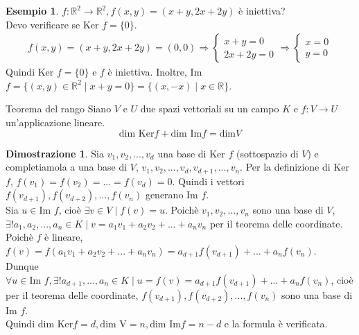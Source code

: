 \documentclass[a4paper]{article}
\theoremstyle{definition}
\newtheorem*{dimm}{Dimostrazione}
\newtheorem*{es}{Esempio}
\begin{document}
\begin{es}
	$f: \mathbb{R}^2 \rightarrow \mathbb{R}^2, f(x, y) = (x + y, 2x + 2y)$ è iniettiva? \\
	Devo verificare se Ker $f = \{0\}$.
	\begin{align*}
		f(x, y) = (x + y, 2x + 2y) = (0, 0) \Rightarrow \begin{cases}
			                                                x + y = 0 \\
			                                                2x + 2y = 0
		                                                \end{cases}
		\Rightarrow \begin{cases}
			            x = 0 \\
			            y = 0
		            \end{cases}
	\end{align*}
	Quindi Ker $f = \{0\}$ e $f$ è iniettiva.
	Inoltre, Im $f = \{(x, y) \in \mathbb{R}^2 \mid x + y = 0\} = \{(x, -x) \mid x \in \mathbb{R}\}$.
\end{es}
\begin{teo}{Teorema del rango}{}
	Siano $V$ e $U$ due spazi vettoriali su un campo $K$ e $f: V \rightarrow U$ un'applicazione lineare.
	\begin{equation*}
		\text{dim Ker} f + \text{dim Im} f = \text{dim} V
	\end{equation*}
\end{teo}
\begin{dimm}
	Sia $v_1, v_2, ..., v_d$ una base di Ker $f$ (sottospazio di $V$) e completiamola a una base di $V$, $v_1, v_2, ..., v_d, v_{d+1}, ..., v_n$.
	Per la definizione di Ker $f$, $f(v_1) = f(v_2) = ... = f(v_d) = 0$.
	Quindi i vettori $f(v_{d+1}), f(v_{d+2}), ..., f(v_n)$ generano Im $f$. \\
	Sia $u \in \text{Im } f$, cioè $\exists v \in V \mid f(v) = u$. Poichè $v_1, v_2, ..., v_n$ sono una base di $V$,
	$\exists! a_1, a_2, ..., a_n \in K \mid v = a_1v_1 + a_2v_2 + ... + a_nv_n$ per il teorema delle coordinate. \\
	Poichè $f$ è lineare, $f(v) = f(a_1v_1 + a_2v_2 + ... + a_nv_n) = a_{d+1}f(v_{d+1}) + ... + a_nf(v_n)$. \\
	Dunque $\forall u \in \text{Im } f, \exists! a_{d+1}, ..., a_n \in K \mid u = f(v) = a_{d+1}f(v_{d+1}) + ... + a_nf(v_n)$,
	cioè per il teorema delle coordinate, $f(v_{d+1}), f(v_{d+2}), ..., f(v_n)$ sono una base di Im $f$. \\
	Quindi $\text{dim Ker} f = d, \text{dim V} = n, \text{dim Im} f = n - d$ e la formula è verificata.
\end{dimm}
\end{document}
